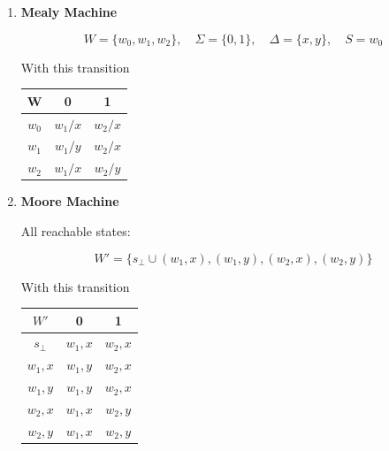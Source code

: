 \documentclass[12pt,a4paper,openany]{article}
\begin{document}
\begin{enumerate}

\item \textbf{Mealy Machine}

\[
W = \{w_0, w_1, w_2\}, \quad 
\Sigma = \{0, 1\}, \quad 
\Delta = \{x,y\}, \quad 
S = w_0
\]

With this transition

\begin{center}
\begin{tabular}{c|cc}
W & 0 & 1 \\
\hline
$w_0$ & $w_1/x$ & $w_2/x$ \\
$w_1$ & $w_1/y$ & $w_2/x$ \\
$w_2$ & $w_1/x$ & $w_2/y$ \\
\end{tabular}
\end{center}

\begin{center}
\end{center}

\item \textbf{Moore Machine}

All reachable states:

\[
W' = \{ s_\bot \cup (w_1,x), (w_1,y), (w_2,x), (w_2,y) \} 
\]

With this transition

\begin{center}
\begin{tabular}{c|cc}
$W'$ &   0 & 1 \\
\hline
$s_\bot$ &  $w_1,x$ & $w_2,x$ \\
$w_1,x$ & $w_1,y$ & $w_2,x$ \\
$w_1,y$ &  $w_1,y$ & $w_2,x$ \\
$w_2,x$ &  $w_1,x$ & $w_2,y$ \\
$w_2,y$ &  $w_1,x$ & $w_2,y$ \\
\end{tabular}
\end{center}



\end{enumerate}
\end{document}
